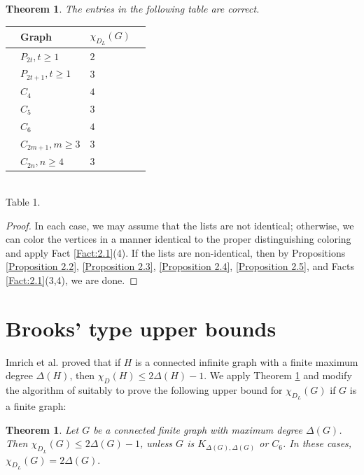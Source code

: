 \documentclass[12pt,reqno,a4paper]{amsart}
\theoremstyle{definition}
\newtheorem{thm}[defn]{Theorem}
\begin{document}
\begin{thm}\label{Theorem 2.7}
    {\em The entries in the following table are correct.}
    
\begin{center}
      \begin{tabular}{|ll|l|l|}
        \hline
             & Graph & $\chi_{D_L}(G)$ \\
             \hline\hline
             & $P_{2t}, t\geq 1$ & $2$\\
             & $P_{2t+1}, t\geq 1$ & $3$ \\
             & $C_4$ & $4$ \\
             & $C_5$ & $3$ \\
             & $C_6$ & $4$\\
             & $C_{2m+1}, m\geq 3$  & $3$ \\
             & $C_{2n}, n\geq 4$ & $3$ \\
               
        \hline
        \end{tabular}
        \\
       Table 1. 
        \label{tab:my_label}
    \end{center}  
\end{thm}

\begin{proof}
In each case, we may assume that the lists are not identical; otherwise, we can color the vertices in a manner identical to the proper distinguishing coloring and apply Fact \ref{Fact:2.1}(4). If the lists are non-identical, then by Propositions \ref{Proposition 2.2}, \ref{Proposition 2.3}, \ref{Proposition 2.4}, \ref{Proposition 2.5}, and Facts \ref{Fact:2.1}(3,4), we are done.
\end{proof}

\section{Brooks' type upper bounds}

Imrich et al. \cite[Theorem 3]{IKPS2017} proved that if $H$ is a connected infinite graph with a finite maximum degree $\Delta(H)$, then $\chi_{D}(H)\leq 2\Delta(H)-1$.
We apply Theorem \ref{Theorem 2.7} and modify the algorithm of \cite[Theorem 3]{IKPS2017} suitably to prove the following upper bound for $\chi_{D_{L}}(G)$ if $G$ is a finite graph:

\begin{thm}\label{Theorem 3.1}
{\em Let $G$ be a connected finite graph with maximum degree $\Delta(G)$. Then $\chi_{D_{L}}(G)\leq 2\Delta(G)-1$, unless $G$ is  $K_{\Delta(G),\Delta(G)}$ or $C_6$. In these cases, $\chi_{D_{L}}(G) = 2\Delta(G)$}.    
\end{thm}
\end{document}

